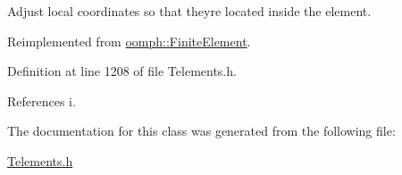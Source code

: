 Adjust local coordinates so that they\textquotesingle{}re located inside the element. 



Reimplemented from \hyperlink{classoomph_1_1FiniteElement_aa042b56813a8dd8ac0e1b19ae2bbe9d1}{oomph\+::\+Finite\+Element}.



Definition at line 1208 of file Telements.\+h.



References i.



The documentation for this class was generated from the following file\+:\begin{DoxyCompactItemize}
\item 
\hyperlink{Telements_8h}{Telements.\+h}\end{DoxyCompactItemize}
